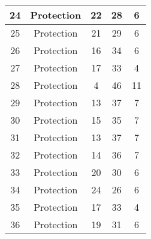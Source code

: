 \documentclass[results.tex]{subfiles}
\begin{document}
\begin{center}
\begin{tabular}{| c || c | c | c | c |}
            \hline
            24                      & Protection                   & 22                     & 28                      & 6                    \\
            \hline
            25                      & Protection                   & 21                     & 29                      & 6                    \\
            \hline
            26                      & Protection                   & 16                     & 34                      & 6                    \\
            \hline
            27                      & Protection                   & 17                     & 33                      & 4                    \\
            \hline
            28                      & Protection                   & 4                      & 46                      & 11                   \\
            \hline
            29                      & Protection                   & 13                     & 37                      & 7                    \\
            \hline
            30                      & Protection                   & 15                     & 35                      & 7                    \\
            \hline
            31                      & Protection                   & 13                     & 37                      & 7                    \\
            \hline
            32                      & Protection                   & 14                     & 36                      & 7                    \\
            \hline
            33                      & Protection                   & 20                     & 30                      & 6                    \\
            \hline
            34                      & Protection                   & 24                     & 26                      & 6                    \\
            \hline
            35                      & Protection                   & 17                     & 33                      & 4                    \\
            \hline
            36                      & Protection                   & 19                     & 31                      & 6                    \\

\end{tabular}
\end{center}
\end{document}

